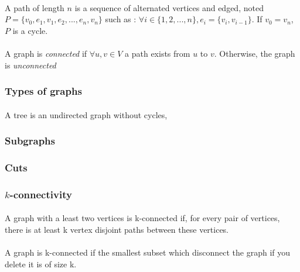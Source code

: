 \paragraph{}
A path of length $n$ is a sequence of alternated vertices and edged, noted
$P = \{v_0, e_1, v_1, e_2, ..., e_n, v_n\}$ such as :
$\forall i \in \{1,2, ..., n\}, e_i = \{v_i, v_{i-1}\}$. If $v_0 = v_n$, $P$ is
a cycle.

\paragraph{}
A graph  is {\em connected} if $\forall u,v \in V$ a path exists from $u$
to $v$. Otherwise, the graph is {\em unconnected}

\subsubsection{Types of graphs}

\paragraph{}
A tree is an undirected graph without cycles,

\subsubsection{Subgraphs}

\subsubsection{Cuts}

\subsubsection{$k$-connectivity}
\paragraph{}
A graph with a least two vertices is k-connected if, for every pair of vertices, there is at least k vertex disjoint paths between these vertices.

\paragraph{}
A graph is k-connected if the smallest subset which disconnect the graph if you delete it is of size k.

